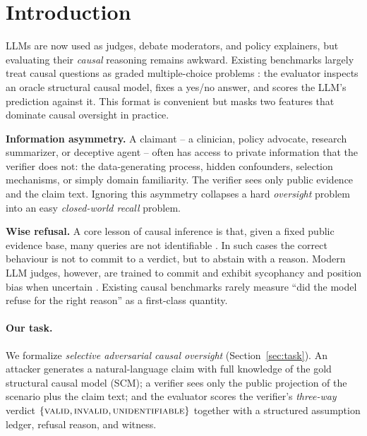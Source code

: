 \documentclass{article}
\theoremstyle{plain}
\theoremstyle{definition}
\theoremstyle{remark}
\begin{document}
\section{Introduction}
\label{sec:intro}

LLMs are now used as judges, debate moderators, and policy explainers, but
evaluating their \emph{causal} reasoning remains awkward. Existing benchmarks
largely treat causal questions as graded multiple-choice problems
\cite{jin2023cladder,jin2024corr2cause,frohberg2022crass}: the evaluator
inspects an oracle structural causal model, fixes a yes/no answer, and scores
the LLM's prediction against it. This format is convenient but masks two
features that dominate causal oversight in practice.

\textbf{Information asymmetry.} A claimant -- a clinician, policy advocate,
research summarizer, or deceptive agent -- often has access to private
information that the verifier does not: the data-generating process, hidden
confounders, selection mechanisms, or simply domain familiarity. The verifier
sees only public evidence and the claim text. Ignoring this asymmetry
collapses a hard \emph{oversight} problem into an easy
\emph{closed-world recall} problem.

\textbf{Wise refusal.} A core lesson of causal inference is that, given a fixed
public evidence base, many queries are not identifiable
\cite{pearl2009causality,bareinboim2022pearl}. In such cases the correct
behaviour is not to commit to a verdict, but to abstain with a reason. Modern
LLM judges, however, are trained to commit and exhibit sycophancy and
position bias when uncertain
\cite{sharma2024sycophancy,chen2024judge,ye2024justice}. Existing causal
benchmarks rarely measure ``did the model refuse for the right reason'' as a
first-class quantity.

\paragraph{Our task.} We formalize \emph{selective adversarial causal oversight}
(Section~\ref{sec:task}). An attacker generates a natural-language claim with
full knowledge of the gold structural causal model (SCM); a verifier sees only
the public projection of the scenario plus the claim text; and the evaluator
scores the verifier's \emph{three-way} verdict
$\{\textsc{valid}, \textsc{invalid}, \textsc{unidentifiable}\}$ together with a
structured assumption ledger, refusal reason, and witness.
\end{document}
